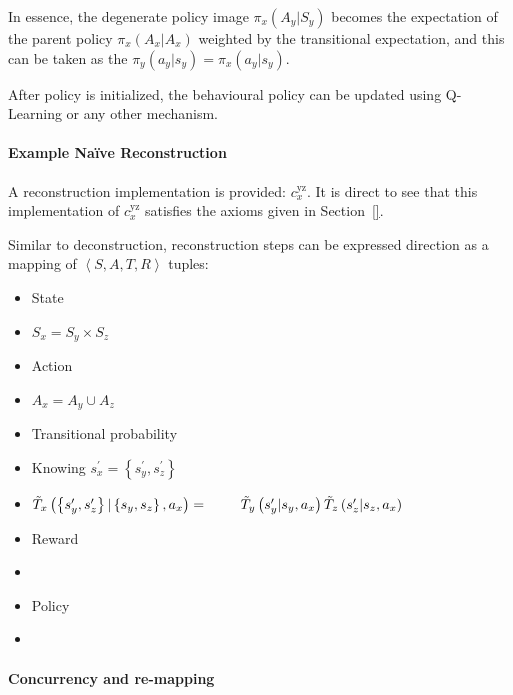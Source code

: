 \documentclass[compsoc,journal,letterpaper,10pt,draftcls,twocolumn]{IEEEtran}
\begin{document}
In essence, the degenerate policy image
\(\pi_{x}\left( A_{y}| S_{y} \right)\) becomes the expectation of the
parent policy \(\pi_{x}\left( A_{x}| A_{x} \right)\) weighted by the
transitional expectation, and this can be taken as the
\(\pi_{y}\left( a_{y}| s_{y} \right) = \pi_{x}\left( a_{y}| s_{y} \right)\). 

After policy is initialized, the behavioural policy can be updated using
Q-Learning or any other mechanism.

 
\paragraph{Example Na\"{i}ve
Reconstruction}\label{example-nauxefve-reconstruction}

A reconstruction implementation is provided: \(c_{x}^{\text{yz}}\). It
is direct to see that this implementation of \(c_{x}^{\text{yz}}\)
satisfies the axioms given in Section~\ref{}.

Similar to deconstruction, reconstruction steps can be expressed
direction as a mapping of \(\left\langle S,A,T,R \right\rangle\) tuples:

\begin{itemize}
\item
  State
\item
  \(S_{x} = S_{y} \times S_{z}\)
\item
  Action
\item
  \(A_{x} = A_{y} \cup A_{z}\)
\item
  Transitional probability
\item
  Knowing \(s_{x}^{\prime} = \left\{ s_{y}^{\prime},s_{z}^{\prime} \right\}\)
\item
  \({\tilde{T}}_{x}\left( \left\{ s_{y}^{\prime},s_{z}^{\prime} \right\}|\left\{ s_{y}, s_{z} \right\}, a_{x} \right) = \\ {\ } \qquad  {\tilde{T}}_{y}\left( s_{y}^{\prime}| s_{y}, a_{x} \right){\tilde{T}}_{z}\left( s_{z}^{\prime}|s_{z}, a_{x} \right)\)
\item
  Reward
\item
\item
  Policy
\item
\end{itemize} 

\paragraph{Concurrency and
re-mapping}\label{concurrency-and-re-mapping}
\end{document}
